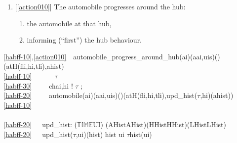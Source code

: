 {\mnewfoil
\begin{enumerate}\setei
\item \label{habff-10} {[\ref{action010}]} The automobile progresses around the hub:
\begin{enumerate}
\item \label{habff-20} the automobile  at that hub,  
\item \label{habff-30} informing (``first'') the hub behaviour.
\end{enumerate}
\savei\end{enumerate}

%
\bp
\ref{habff-10},\ref{action010}\ \ automobile\_progress\_around\_hub(ai)(aai,uis)({\DOTDOTDOT})(atH(fli,hi,tli),ahist) {\IS}\\
\ref{habff-10}\ \ \ \ \ \  $\tau$ {\EQ} \recordtime\  \\
\ref{habff-30}\ \ \ \ \ ch{\LBRACKET}ai,hi{\RBRACKET} ! $\tau$ ;\\
\ref{habff-20}\ \ \ \ \ automobile(ai)(aai,uis)({\DOTDOTDOT})(atH(fli,hi,tli),upd\_hist($\tau$,hi)(ahist))\\
\ref{habff-10}\ \ \ \ \ \ \\
\\
\ref{habff-20}\ \ \ upd\_hist: ($\mathbb{TIME}${\TIMES}UI) {\RIGHTARROW} (AHist{\RIGHTARROW}AHist){\BAR}(HHist{\RIGHTARROW}HHist){\BAR}(LHist{\RIGHTARROW}LHist)\ \ \\
\ref{habff-20}\ \ \ upd\_hist($\tau$,ui)(hist) {\IS} hist {\DAGGER} {\LBRACKET}ui {\MAPSTO} {\LANGLE}$\tau${\RANGLE}{\CONCAT}hist(ui){\RBRACKET}
\ep


\mnewfoil

}
